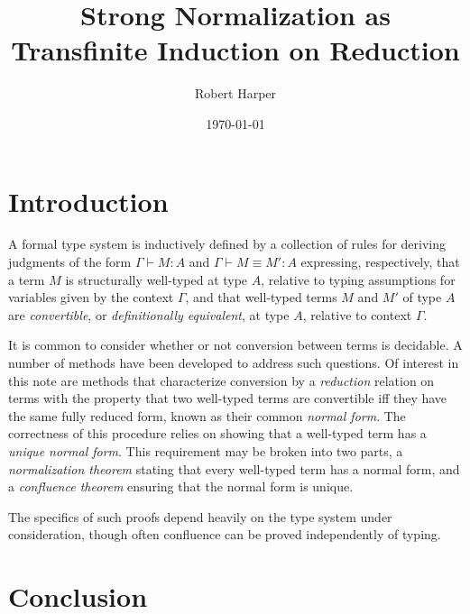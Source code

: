 \documentclass[11pt,twoside]{article}
\begin{document}
\title{Strong Normalization as Transfinite Induction on Reduction}
\author{Robert Harper}
\date{\today}

\maketitle{}

\section{Introduction}

A formal type system is inductively defined by a collection of rules for deriving
judgments of the form $\Gamma\vdash M:A$ and $\Gamma\vdash M\equiv M':A$ expressing, respectively, that a term
$M$ is structurally well-typed at type $A$, relative to typing assumptions for variables
given by the context $\Gamma$, and that well-typed terms $M$ and $M'$ of type $A$ are
\emph{convertible}, or \emph{definitionally equivalent}, at type $A$, relative to context
$\Gamma$.

It is common to consider whether or not conversion between terms is decidable. A number of
methods have been developed to address such questions. Of interest in this note are
methods that characterize conversion by a \emph{reduction} relation on terms with the
property that two well-typed terms are convertible iff they have the same fully reduced
form, known as their common \emph{normal form}. The correctness of this procedure relies
on showing that a well-typed term has a \emph{unique normal form}. This requirement may be
broken into two parts, a \emph{normalization theorem} stating that every well-typed term
has a normal form, and a \emph{confluence theorem} ensuring that the normal form is
unique.

The specifics of such proofs depend heavily on the type system under consideration, though
often confluence can be proved independently of typing.


\section{Conclusion}



\end{document}
